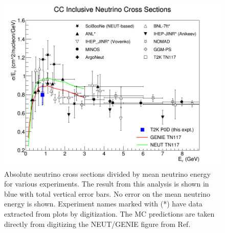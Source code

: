 \begin{figure}[h]
\centering
\includegraphics[width=7in]{Figures/XSec.png}
\caption{Absolute neutrino cross sections divided by mean neutrino energy for various experiments. The result from this analysis is shown in blue with total vertical error bars. No error on the mean neutrino energy is shown. Experiment names marked with (*) have data extracted from plots by digitization. The MC predictions are taken directly from digitizing the NEUT/GENIE figure from Ref\cite{ccinc}.}
\label{fig:xsdata}
\end{figure}
